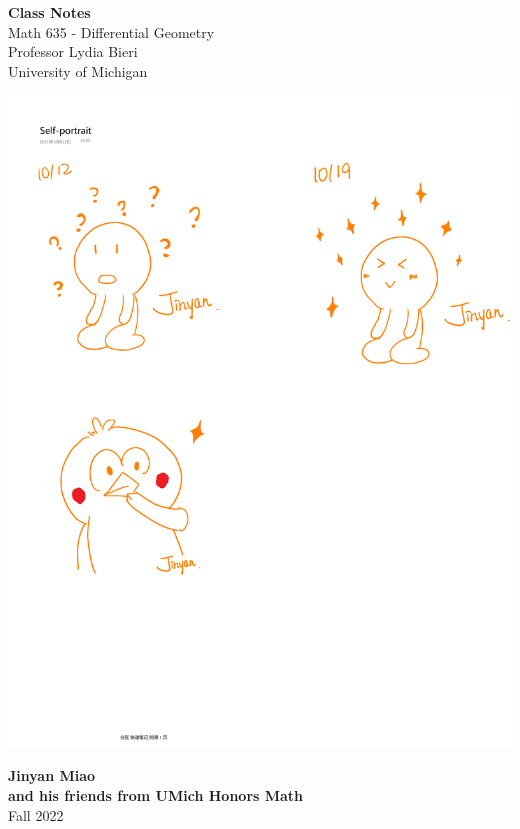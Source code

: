 \documentclass[11pt]{book}
\theoremstyle{break}
\theoremstyle{break}
\begin{document}
	\begin{titlepage}
		\begin{center}
			\vspace*{1cm}
			\Huge \color{red}
				\textbf{Class Notes}\\
			\vspace{0.5cm}			
			\Large \color{black}
				Math 635 - Differential Geometry\\
				Professor Lydia Bieri\\	
				University of Michigan\\
			\vspace{2cm}

			\includegraphics[scale=1.15]{hmm.pdf}
			
			
			\vspace{4cm}
			\LARGE
				\textbf{Jinyan Miao}\\
				\large \textbf{and his friends from UMich Honors Math}\\
				\hfill\break
				\LARGE Fall 2022\\
			\vspace{1cm}

		\vspace*{\fill}
		\end{center}			
	\end{titlepage}
\end{document}
